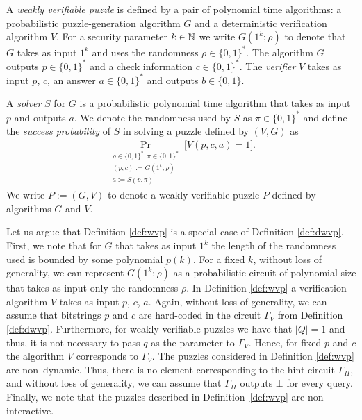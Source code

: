 \begin{definition}
  \label{def:wvp}
A \textit{weakly verifiable puzzle} is defined by a pair of polynomial time algorithms:
a probabilistic puzzle-generation algorithm $G$ and a deterministic verification algorithm $V$.
For a security parameter $k \in \mathbb{N}$ we write $G(1^k; \rho)$ to denote that $G$ takes as input $1^k$
and uses the randomness $\rho \in \{0,1\}^{*}$.
The algorithm $G$ outputs $p \in \{0,1\}^{*}$ and a check information $c \in \{0,1\}^{*}$.
The \textit{verifier} $V$ takes as input $p$, $c$, an answer $a \in \{0,1\}^{*}$ and outputs $b \in \{0,1\}$.

A \textit{solver} $S$ for $G$ is a probabilistic polynomial time algorithm that
takes as input $p$ and outputs $a$. We denote the randomness used by $S$ as $\pi \in \{0,1\}^{*}$
and define the \textit{success probability} of $S$ in solving a puzzle defined by $(V,G)$ as
\begin{align*}
  \underset{\substack{\rho \in \{0,1\}^{*}, \pi \in \{0,1\}^{*} \\ (p,c):=G(1^k; \rho) \\ a := S(p, \pi)}}{\Pr}\Big[ V(p,c,a) = 1\Big].
\end{align*}
We write $P := (G,V)$ to denote a weakly verifiable puzzle $P$ defined by algorithms $G$ and $V$.
\end{definition}

Let us argue that Definition \ref{def:wvp} is a special case of Definition \ref{def:dwvp}.
First, we note that for $G$ that takes as input $1^k$ the length of the randomness used is bounded by some polynomial $p(k)$.
For a fixed $k$, without loss of generality, we can represent $G(1^k; \rho)$ as a probabilistic circuit of polynomial size
that takes as input only the randomness $\rho$.
In Definition \ref{def:wvp} a verification algorithm $V$ takes as input $p$, $c$, $a$.
Again, without loss of generality, we can assume that bitstrings $p$ and $c$ are hard-coded
in the circuit $\Gamma_V$ from Definition \ref{def:dwvp}.
Furthermore, for weakly verifiable puzzles we have that $|Q| = 1$ and thus,
it is not necessary to pass $q$ as the parameter to $\Gamma_V$.
Hence, for fixed $p$ and $c$ the algorithm $V$ corresponds to $\Gamma_V$.
The puzzles considered in Definition \ref{def:wvp} are non--dynamic.
Thus, there is no element corresponding to the hint circuit $\Gamma_H$, and without loss of generality, we can assume that
$\Gamma_H$ outputs $\bot$ for every query.
Finally, we note that the puzzles described in Definition~\ref{def:wvp} are non-interactive.

